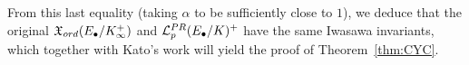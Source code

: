 \documentclass[a4paper,10pt]{amsart}
\numberwithin{equation}{section}
\numberwithin{equation}{section}
\theoremstyle{plain}
\theoremstyle{definition}
\theoremstyle{definition}
\theoremstyle{plain}
\theoremstyle{plain}
\theoremstyle{plain}
\theoremstyle{plain}
\newcommand{\Q}{\mathbb{Q}}
\newcommand{\X}{\mathfrak{X}}
\DeclareMathOperator{\loc}{loc}
\newcommand{\Lcal}{\mathcal{L}}
\newcommand{\rH}{\mathrm{H}}
\begin{document}
From this last equality (taking $\alpha$ to be sufficiently close to $1$), we deduce that the original $\mathfrak{X}_{\rm ord}(E_\bullet/K_\infty^+)$ and $\Lcal_p^{\rm PR}(E_\bullet/K)^+$ have the same Iwasawa invariants, which together with Kato's work will yield the proof of Theorem~\ref{thm:CYC}. 





\end{document}
